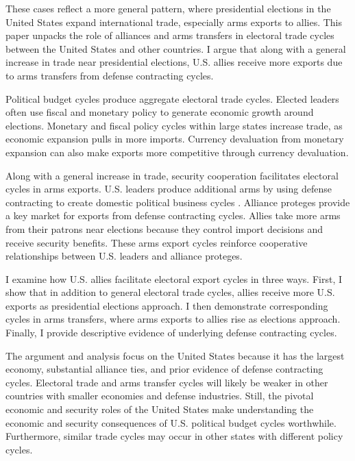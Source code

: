 \documentclass[12pt]{article}
\begin{document}
These cases reflect a more general pattern, where presidential elections in the United States expand international trade, especially arms exports to allies.
This paper unpacks the role of alliances and arms transfers in electoral trade cycles between the United States and other countries. 
I argue that along with a general increase in trade near presidential elections, U.S. allies receive more exports due to arms transfers from defense contracting cycles. 


Political budget cycles produce aggregate electoral trade cycles.
Elected leaders often use fiscal and monetary policy \citep{Nordhaus1975, Tufte1978, Rogoff1987, ClarkHallerberg2000} to generate economic growth around elections. 
Monetary and fiscal policy cycles within large states increase trade, as economic expansion pulls in more imports.
Currency devaluation from monetary expansion can also make exports more competitive through currency devaluation. 


Along with a general increase in trade, security cooperation facilitates electoral cycles in arms exports. 
U.S. leaders produce additional arms by using defense contracting to create domestic political business cycles \citep{Tufte1978, Mintz1988, Mayer1995, DerouenHeo2000, Becker2021}.
Alliance proteges provide a key market for exports from defense contracting cycles.
Allies take more arms from their patrons near elections because they control import decisions and receive security benefits. 
These arms export cycles reinforce cooperative relationships between U.S. leaders and alliance proteges.


I examine how U.S. allies facilitate electoral export cycles in three ways. 
First, I show that in addition to general electoral trade cycles, allies receive more U.S. exports as presidential elections approach.
I then demonstrate corresponding cycles in arms transfers, where arms exports to allies rise as elections approach.  
Finally, I provide descriptive evidence of underlying defense contracting cycles.


The argument and analysis focus on the United States because it has the largest economy, substantial alliance ties, and prior evidence of defense contracting cycles. 
Electoral trade and arms transfer cycles will likely be weaker in other countries with smaller economies and defense industries. 
Still, the pivotal economic and security roles of the United States make understanding the economic and security consequences of U.S. political budget cycles worthwhile.
Furthermore, similar trade cycles may occur in other states with different policy cycles. 
\end{document}
